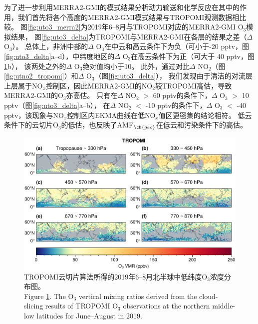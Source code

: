 为了进一步利用MERRA2-GMI的模式结果分析动力输送和化学反应在其中的作用，我们首先将各个高度的MERRA2-GMI模式结果与TROPOMI观测数据相比较。
图\ref{fig:uto3_merra2}为2019年6--8月与TROPOMI对应的MERRA2-GMI O$_3$模拟结果，
图\ref{fig:uto3_delta}为TROPOMI与MERRA2-GMI在各层的结果之差（$\Delta$ O$_3$）。
总体上，非洲中部的$\Delta$ O$_3$在中云和高云条件下为负（可小于-20 pptv，图\ref{fig:uto3_delta}a--d），中纬度地区的$\Delta$ O$_3$在高云条件下为正（可大于 40 pptv，图\ref{fig:uto3_tropomi}b），
该两处之外的$\Delta$ O$_3$绝对值均小于10。
此外，通过对比$\Delta$ NO$_2$（图\ref{fig:utno2_tropomi}）和$\Delta$ O$_3$（图\ref{fig:uto3_delta}），
我们发现由于清洁的对流层上层属于NO$_x$控制区\citep{Brown.2022}，因此MERRA2-GMI的NO$_2$较TROPOMI高估，导致MERRA2-GMI的O$_3$亦高估。
只有在$\Delta$ NO$_2$ $>$ 60 pptv的条件下，$\Delta$ O$_3$ $>$ 10 pptv（图\ref{fig:uto3_delta}a--b），
在$\Delta$ NO$_2$ $<$ -10 pptv的条件下，$\Delta$ O$_3$ $<$ -40 pptv，该现象与NO$_x$控制区内EKMA曲线在低NO$_x$值区更密集的结论相符。
低云条件下的云切片O$_3$的低估，也反映了AMF$_{\ch{geo}}$在低云和污染条件下的高估\citep{BelmonteRivas.2015}。

\begin{figure}[!htbp]
    \centering
    \includegraphics[width=15cm]{./figures/uto3_tropomi.png}
    \caption{
    TROPOMI云切片算法所得的2019年6--8月北半球中低纬度O$_3$浓度分布图。 \\
    Figure \ref{fig:uto3_tropomi}. The O$_3$ vertical mixing ratios derived from the cloud-slicing results of TROPOMI O$_3$ observations at the northern middle-low latitudes for June--August in 2019.
    }
    \label{fig:uto3_tropomi}
\end{figure}


